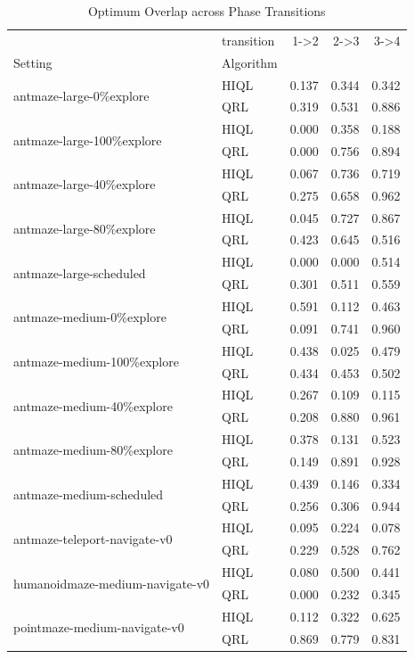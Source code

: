 \begin{table}
\caption{Optimum Overlap across Phase Transitions}
\label{tab:optimum-overlap-phases}
\begin{tabular}{llrrr}
\toprule
 & transition & 1->2 & 2->3 & 3->4 \\
Setting & Algorithm &  &  &  \\
\midrule
\multirow[t]{2}{*}{antmaze-large-0\%explore} & HIQL & 0.137 & 0.344 & 0.342 \\
 & QRL & 0.319 & 0.531 & 0.886 \\
\cline{1-5}
\multirow[t]{2}{*}{antmaze-large-100\%explore} & HIQL & 0.000 & 0.358 & 0.188 \\
 & QRL & 0.000 & 0.756 & 0.894 \\
\cline{1-5}
\multirow[t]{2}{*}{antmaze-large-40\%explore} & HIQL & 0.067 & 0.736 & 0.719 \\
 & QRL & 0.275 & 0.658 & 0.962 \\
\cline{1-5}
\multirow[t]{2}{*}{antmaze-large-80\%explore} & HIQL & 0.045 & 0.727 & 0.867 \\
 & QRL & 0.423 & 0.645 & 0.516 \\
\cline{1-5}
\multirow[t]{2}{*}{antmaze-large-scheduled} & HIQL & 0.000 & 0.000 & 0.514 \\
 & QRL & 0.301 & 0.511 & 0.559 \\
\cline{1-5}
\multirow[t]{2}{*}{antmaze-medium-0\%explore} & HIQL & 0.591 & 0.112 & 0.463 \\
 & QRL & 0.091 & 0.741 & 0.960 \\
\cline{1-5}
\multirow[t]{2}{*}{antmaze-medium-100\%explore} & HIQL & 0.438 & 0.025 & 0.479 \\
 & QRL & 0.434 & 0.453 & 0.502 \\
\cline{1-5}
\multirow[t]{2}{*}{antmaze-medium-40\%explore} & HIQL & 0.267 & 0.109 & 0.115 \\
 & QRL & 0.208 & 0.880 & 0.961 \\
\cline{1-5}
\multirow[t]{2}{*}{antmaze-medium-80\%explore} & HIQL & 0.378 & 0.131 & 0.523 \\
 & QRL & 0.149 & 0.891 & 0.928 \\
\cline{1-5}
\multirow[t]{2}{*}{antmaze-medium-scheduled} & HIQL & 0.439 & 0.146 & 0.334 \\
 & QRL & 0.256 & 0.306 & 0.944 \\
\cline{1-5}
\multirow[t]{2}{*}{antmaze-teleport-navigate-v0} & HIQL & 0.095 & 0.224 & 0.078 \\
 & QRL & 0.229 & 0.528 & 0.762 \\
\cline{1-5}
\multirow[t]{2}{*}{humanoidmaze-medium-navigate-v0} & HIQL & 0.080 & 0.500 & 0.441 \\
 & QRL & 0.000 & 0.232 & 0.345 \\
\cline{1-5}
\multirow[t]{2}{*}{pointmaze-medium-navigate-v0} & HIQL & 0.112 & 0.322 & 0.625 \\
 & QRL & 0.869 & 0.779 & 0.831 \\
\cline{1-5}
\bottomrule
\end{tabular}
\end{table}
